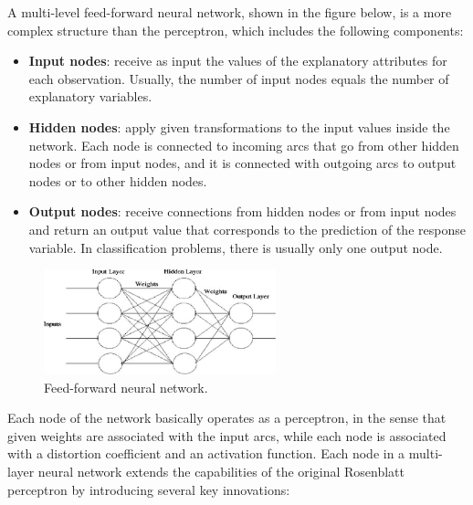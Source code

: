A multi-level feed-forward neural network, shown in the figure below, is a more complex structure than the perceptron, which includes the following components:
\begin{itemize}
    \item \textbf{Input nodes}: receive as input the values of the explanatory attributes for each observation. Usually, the number of input nodes equals the number of explanatory variables.
    \item \textbf{Hidden nodes}: apply given transformations to the input values inside the network. Each node is connected to incoming arcs that go from other hidden nodes or from input nodes, and it is connected with outgoing arcs to output nodes or to other hidden nodes.
    \item \textbf{Output nodes}: receive connections from hidden nodes or from input nodes and return an output value that corresponds to the prediction of the response variable. In classification problems, there is usually only one output node.
\end{itemize}
\begin{figure}[H] 
    \centering
    \includegraphics[width=0.6\textwidth]{Machine_learning_thesis/Images/feed-forward neural network.png}
    \caption{Feed-forward neural network.} 
    \label{fig: Feed-forward neural network} 
    \end{figure}
Each node of the network basically operates as a perceptron, in the sense that given weights are associated with the input arcs, while each node is associated with a distortion coefficient and an activation function. Each node in a multi-layer neural network extends the capabilities of the original Rosenblatt perceptron by introducing several key innovations:
